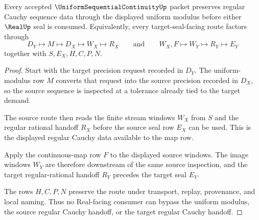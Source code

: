 \begin{theorem}
\label{thm:uniform-sequential-continuity-cauchy-handoff}
Every accepted $\UniformSequentialContinuityUp$ packet preserves regular Cauchy sequence data through the displayed uniform modulus before either $\RealUp$ seal is consumed. Equivalently, every target-seal-facing route factors through
$$
D_Y \longmapsto M \longmapsto D_X \longmapsto W_X \longmapsto R_X
\qquad\text{and}\qquad
W_X,F \longmapsto W_Y \longmapsto R_Y \longmapsto E_Y
$$
together with $S,E_X,H,C,P,N$.
\end{theorem}
\begin{proof}
Start with the target precision request recorded in $D_Y$. The uniform-modulus row $M$ converts that request into the source precision recorded in $D_X$, so the source sequence is inspected at a tolerance already tied to the target demand.

The source route then reads the finite stream windows $W_X$ from $S$ and the regular rational handoff $R_X$ before the source seal row $E_X$ can be used. This is the displayed regular Cauchy data available to the map row.

Apply the continuous-map row $F$ to the displayed source windows. The image windows $W_Y$ are therefore downstream of the same source inspection, and the target regular-rational handoff $R_Y$ precedes the target seal $E_Y$.

The rows $H,C,P,N$ preserve the route under transport, replay, provenance, and local naming. Thus no Real-facing consumer can bypass the uniform modulus, the source regular Cauchy handoff, or the target regular Cauchy handoff.
\end{proof}


\begin{closurestatus}{\UniformSequentialContinuityUp}
  \theoryclosure{\seedClosure}
  \formalstatus{\unformalizedV}
\end{closurestatus}
